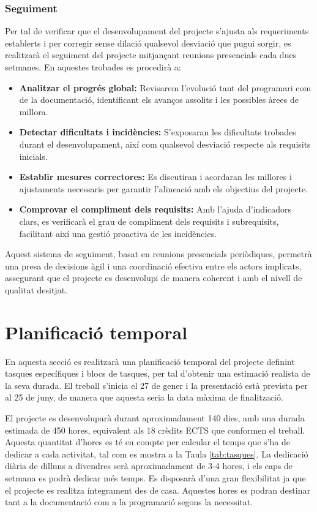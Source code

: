 \documentclass[a4paper,12pt]{report}
\begin{document}
\subsection{Seguiment}

Per tal de verificar que el desenvolupament del projecte s’ajusta als requeriments establerts i per corregir sense dilació qualsevol desviació que pugui sorgir, es realitzarà el seguiment del projecte mitjançant reunions presencials cada dues setmanes. En aquestes trobades es procedirà a:

\begin{itemize}
    \item \textbf{Analitzar el progrés global:} Revisarem l’evolució tant del programari com de la documentació, identificant els avanços assolits i les possibles àrees de millora.
    \item \textbf{Detectar dificultats i incidències:} S'exposaran les dificultats trobades durant el desenvolupament, així com qualsevol desviació respecte als requisits inicials.
    \item \textbf{Establir mesures correctores:} Es discutiran i acordaran les millores i ajustaments necessaris per garantir l'alineació amb els objectius del projecte.
    \item \textbf{Comprovar el compliment dels requisits:} Amb l’ajuda d’indicadors clars, es verificarà el grau de compliment dels requisits i subrequisits, facilitant així una gestió proactiva de les incidències.
\end{itemize}

Aquest sistema de seguiment, basat en reunions presencials periòdiques, permetrà una presa de decisions àgil i una coordinació efectiva entre els actors implicats, assegurant que el projecte es desenvolupi de manera coherent i amb el nivell de qualitat desitjat.

\chapter{Planificació temporal}

En aquesta secció es realitzarà una planificació temporal del projecte definint tasques específiques i blocs de tasques, per tal d'obtenir una estimació realista de la seva durada.
El treball s'inicia el 27 de gener i la presentació està prevista per al 25 de juny, de manera que aquesta seria la data màxima de finalització.

El projecte es desenvoluparà durant aproximadament 140 dies, amb una durada estimada de 450 hores, equivalent als 18 crèdits ECTS que conformen el treball.
Aquesta quantitat d'hores es té en compte per calcular el temps que s'ha de dedicar a cada activitat, tal com es mostra a la Taula \ref{tab:tasques}.
La dedicació diària de dilluns a divendres serà aproximadament de 3-4 hores, i els caps de setmana es podrà dedicar més temps.
Es disposarà d'una gran flexibilitat ja que el projecte es realitza íntegrament des de casa.
Aquestes hores es podran destinar tant a la documentació com a la programació segons la necessitat.
\end{document}
